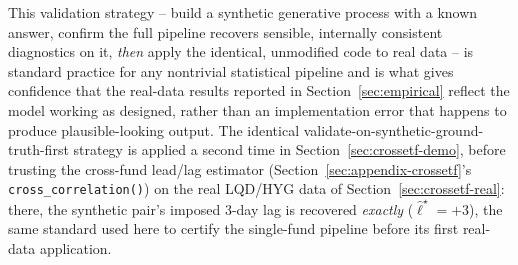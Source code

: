\documentclass[11pt]{article}
\theoremstyle{definition}
\theoremstyle{remark}
\begin{document}
This validation strategy -- build a synthetic generative process with a known answer, confirm the full pipeline recovers sensible, internally consistent diagnostics on it, \emph{then} apply the identical, unmodified code to real data -- is standard practice for any nontrivial statistical pipeline and is what gives confidence that the real-data results reported in Section~\ref{sec:empirical} reflect the model working as designed, rather than an implementation error that happens to produce plausible-looking output. The identical validate-on-synthetic-ground-truth-first strategy is applied a second time in Section~\ref{sec:crossetf-demo}, before trusting the cross-fund lead/lag estimator (Section~\ref{sec:appendix-crossetf}'s \texttt{cross\_correlation()}) on the real LQD/HYG data of Section~\ref{sec:crossetf-real}: there, the synthetic pair's imposed 3-day lag is recovered \emph{exactly} ($\widehat\ell^\star=+3$), the same standard used here to certify the single-fund pipeline before its first real-data application.
\end{document}
